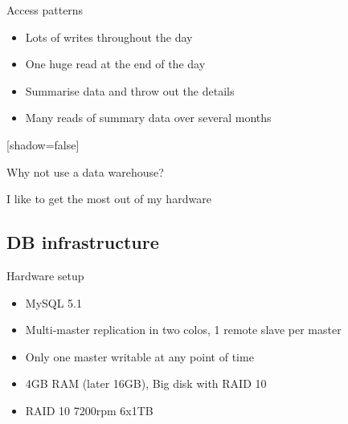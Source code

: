 \documentclass{beamer}
\begin{document}
\begin{frame}{Access patterns}
  \begin{itemize}
  \item Lots of writes throughout the day
  \item One huge read at the end of the day
  \item Summarise data and throw out the details
  \item Many reads of summary data over several months
  \end{itemize}
\end{frame}

[shadow=false]
\begin{frame}{}
  \begin{block}{}
  \begin{center}
  Why not use a data warehouse?
  \end{center}
  \end{block}
\end{frame}

\begin{frame}{}
  \begin{block}{}
  \begin{center}
  I like to get the most out of my hardware
  \end{center}
  \end{block}
\end{frame}

\subsection{DB infrastructure}
\begin{frame}{Hardware setup}
  \begin{itemize}
  \item MySQL 5.1
  \item Multi-master replication in two colos, 1 remote slave per master
  \item Only one master writable at any point of time
  \item 4GB RAM (later 16GB), Big disk with RAID 10
  \item RAID 10 7200rpm 6x1TB
  \end{itemize}
\end{frame}
\end{document}
